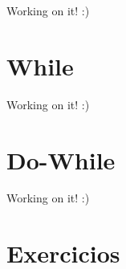 \documentclass[
]{book}
\begin{document}
Working on it! :)

\hypertarget{while}{%
\section{While}\label{while}}

Working on it! :)

\hypertarget{do-while}{%
\section{Do-While}\label{do-while}}

Working on it! :)

\hypertarget{exercicios}{%
\section*{Exercicios}\label{exercicios}}
\end{document}
